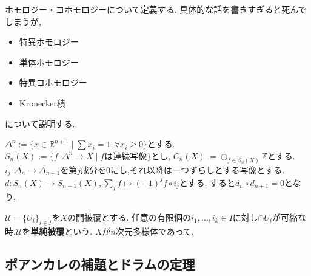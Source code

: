 ホモロジー・コホモロジーについて定義する.
具体的な話を書きすぎると死んでしまうが,

\begin{itemize}
\item 特異ホモロジー
\item 単体ホモロジー
\item 特異コホモロジー
\item Kronecker積
\end{itemize}
について説明する.

$\Delta^n := \{ x \in \mathbb{R}^{n+1} \mid  \sum x_i =1, \forall x_i \ge 0 \}$とする.
$S_n(X) := \{f: \Delta^n \to X \mid f \mbox{は連続写像}\}$とし,
$C_n(X) := \oplus_{f \in S_n(X)} \mathbb{Z}$とする.
$i_j: \Delta_n \to \Delta_{n+1}$を第$j$成分を0にし,それ以降は一つずらしとする写像とする.
$d: S_n(X) \to S_{n-1}(X), \sum_{j} f \mapsto (-1)^j f \circ i_j$とする.
すると$d_n \circ d_{n+1} = 0$となり,

\begin{screen}
\begin{dfn}
$\mathcal{U} =  \{U_i\}_{i \in I}$を$X$の開被覆とする. 任意の有限個の$i_1, \ldots ,i_k \in I$に対し$ \cap U_i$が可縮な時,$\mathcal{U}$を\textbf{単純被覆}という.
$X$が$n$次元多様体であって,
\end{dfn}
\end{screen}

\subsection{ポアンカレの補題とドラムの定理}
